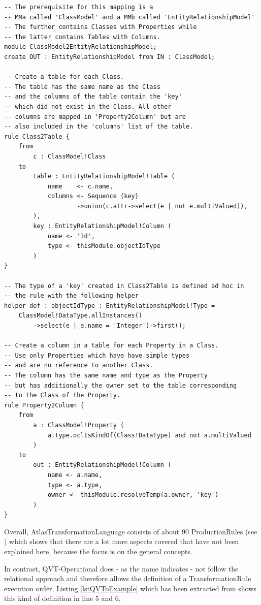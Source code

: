 \begin{lstlisting}[language=ATL,caption={\Gls{AtlasTransformationLanguage} example},label={lstATLExample}]
-- The prerequisite for this mapping is a
-- MMa called 'ClassModel' and a MMb called 'EntityRelationshipModel'
-- The further contains Classes with Properties while
-- the latter contains Tables with Columns.
module ClassModel2EntityRelationshipModel;
create OUT : EntityRelationshipModel from IN : ClassModel; 

-- Create a table for each Class.
-- The table has the same name as the Class
-- and the columns of the table contain the 'key' 
-- which did not exist in the Class. All other 
-- columns are mapped in 'Property2Column' but are 
-- also included in the 'columns' list of the table.
rule Class2Table {
	from
		c : ClassModel!Class
	to
		table : EntityRelationshipModel!Table (
			name 	<- c.name,
			columns <- Sequence {key}
					->union(c.attr->select(e | not e.multiValued)),
		),
		key : EntityRelationshipModel!Column (
			name <- 'Id',
			type <- thisModule.objectIdType
		)
} 

-- The type of a 'key' created in Class2Table is defined ad hoc in
-- the rule with the following helper
helper def : objectIdType : EntityRelationshipModel!Type =
	ClassModel!DataType.allInstances()
		->select(e | e.name = 'Integer')->first(); 

-- Create a column in a table for each Property in a Class.
-- Use only Properties which have have simple types
-- and are no reference to another Class.
-- The column has the same name and type as the Property
-- but has additionally the owner set to the table corresponding
-- to the Class of the Property.
rule Property2Column {
	from
		a : ClassModel!Property (
			a.type.oclIsKindOf(Class!DataType) and not a.multiValued
		)
	to
		out : EntityRelationshipModel!Column (
			name <- a.name,
			type <- a.type,
			owner <- thisModule.resolveTemp(a.owner, 'key')
		)
} 
\end{lstlisting}			

Overall, \gls{AtlasTransformationLanguage} consists of about 90 \glspl{ProductionRule} (see \cite{EclipseFoundation2013}) which shows that there are a lot more aspects covered that have not been explained here, because the focus is on the general concepts.

In contrast, QVT-Operational does - as the name indicates - not follow the relational approach and therefore allows the definition of a \gls{TransformationRule} execution order. Listing \ref{lstQVToExample} which has been extracted from \cite{Rubby2012} shows this kind of definition in line 5 and 6.

